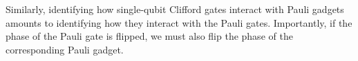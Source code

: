 
Similarly, identifying how single-qubit Clifford gates interact with Pauli gadgets amounts to identifying how they interact with the Pauli gates. Importantly, if the phase of the Pauli gate is flipped, we must also flip the phase of the corresponding Pauli gadget.






